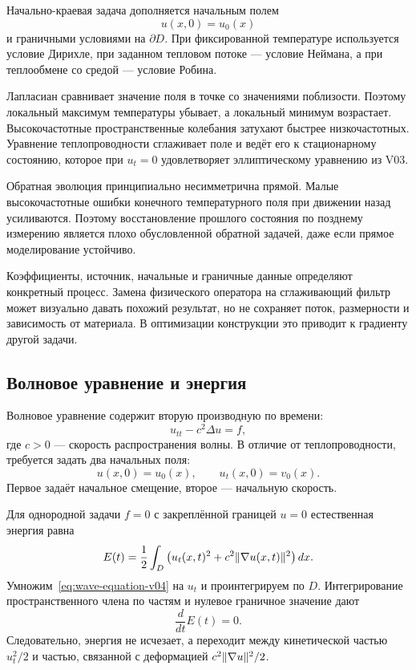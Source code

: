 Начально-краевая задача дополняется начальным полем
\begin{equation}
\label{eq:heat-initial-data-v04}
 u(x,0)=u_0(x)
\end{equation}
и граничными условиями на $\partial D$. При фиксированной температуре используется условие Дирихле, при заданном тепловом потоке --- условие Неймана, а при теплообмене со средой --- условие Робина.

Лапласиан сравнивает значение поля в точке со значениями поблизости. Поэтому локальный максимум температуры убывает, а локальный минимум возрастает. Высокочастотные пространственные колебания затухают быстрее низкочастотных. Уравнение теплопроводности сглаживает поле и ведёт его к стационарному состоянию, которое при $u_t=0$ удовлетворяет эллиптическому уравнению из V03.

Обратная эволюция принципиально несимметрична прямой. Малые высокочастотные ошибки конечного температурного поля при движении назад усиливаются. Поэтому восстановление прошлого состояния по позднему измерению является плохо обусловленной обратной задачей, даже если прямое моделирование устойчиво.

\begin{caution}
Коэффициенты, источник, начальные и граничные данные определяют конкретный процесс. Замена физического оператора на сглаживающий фильтр может визуально давать похожий результат, но не сохраняет поток, размерности и зависимость от материала. В оптимизации конструкции это приводит к градиенту другой задачи.
\end{caution}

\subsection{Волновое уравнение и энергия}

Волновое уравнение содержит вторую производную по времени:
\begin{equation}
\label{eq:wave-equation-v04}
 u_{tt}-c^2\Delta u=f,
\end{equation}
где $c>0$ --- скорость распространения волны. В отличие от теплопроводности, требуется задать два начальных поля:
\begin{equation}
\label{eq:wave-initial-data-v04}
 u(x,0)=u_0(x),
 \qquad
 u_t(x,0)=v_0(x).
\end{equation}
Первое задаёт начальное смещение, второе --- начальную скорость.

Для однородной задачи $f=0$ с закреплённой границей $u=0$ естественная энергия равна
\begin{equation}
\label{eq:wave-energy-v04}
 E(t)
 =
 \frac12\int_D
 \left(
  u_t(x,t)^2
  +c^2\lVert\nabla u(x,t)\rVert^2
 \right)dx.
\end{equation}
Умножим~\eqref{eq:wave-equation-v04} на $u_t$ и проинтегрируем по $D$. Интегрирование пространственного члена по частям и нулевое граничное значение дают
\[
\frac{d}{dt}E(t)=0.
\]
Следовательно, энергия не исчезает, а переходит между кинетической частью $u_t^2/2$ и частью, связанной с деформацией $c^2\lVert\nabla u\rVert^2/2$.


